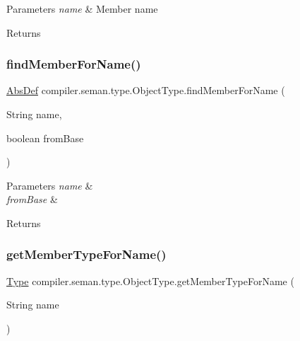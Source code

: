 \begin{DoxyParams}{Parameters}
{\em name} & Member name \\
\hline
\end{DoxyParams}
\begin{DoxyReturn}{Returns}

\end{DoxyReturn}
\mbox{\label{classcompiler_1_1seman_1_1type_1_1_object_type_adc1d6f8388c93b1229ae57d36eefa87d}} 
\subsubsection{\texorpdfstring{find\+Member\+For\+Name()}{findMemberForName()}}
{\footnotesize\ttfamily \hyperlink{classcompiler_1_1abstr_1_1tree_1_1def_1_1_abs_def}{Abs\+Def} compiler.\+seman.\+type.\+Object\+Type.\+find\+Member\+For\+Name (\begin{DoxyParamCaption}\item[{String}]{name,  }\item[{boolean}]{from\+Base }\end{DoxyParamCaption})}


\begin{DoxyParams}{Parameters}
{\em name} & \\
\hline
{\em from\+Base} & \\
\hline
\end{DoxyParams}
\begin{DoxyReturn}{Returns}

\end{DoxyReturn}
\mbox{\label{classcompiler_1_1seman_1_1type_1_1_object_type_acff71113c9cc7c543f8f33a3e46a56c2}} 
\subsubsection{\texorpdfstring{get\+Member\+Type\+For\+Name()}{getMemberTypeForName()}}
{\footnotesize\ttfamily \hyperlink{classcompiler_1_1seman_1_1type_1_1_type}{Type} compiler.\+seman.\+type.\+Object\+Type.\+get\+Member\+Type\+For\+Name (\begin{DoxyParamCaption}\item[{String}]{name }\end{DoxyParamCaption})}

